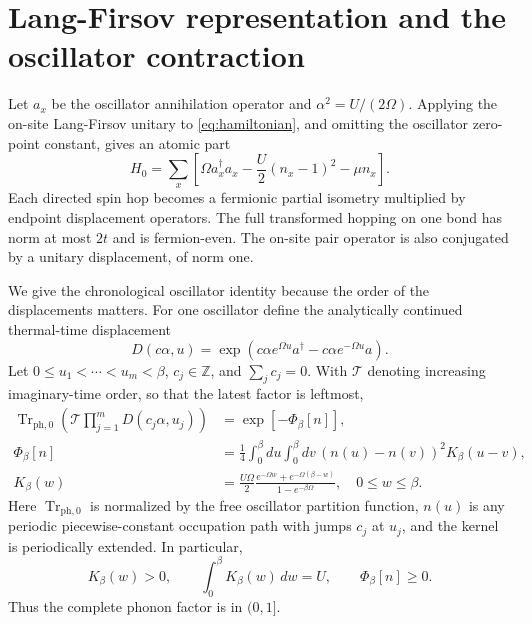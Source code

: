 \documentclass[11pt]{article}
\DeclareMathOperator{\Tr}{Tr}
\newcommand{\Trph}{\Tr_{\mathrm{ph},0}}
\begin{document}
\section{Lang-Firsov representation and the oscillator contraction}

Let $a_x$ be the oscillator annihilation operator and $\alpha^2=U/(2\Omega)$. Applying the on-site Lang-Firsov unitary to \eqref{eq:hamiltonian}, and omitting the oscillator zero-point constant, gives an atomic part
\begin{equation}\label{eq:atomic}
 H_0=\sum_x\left[\Omega a_x^\dagger a_x-\frac U2(n_x-1)^2-\mu n_x\right].
\end{equation}
Each directed spin hop becomes a fermionic partial isometry multiplied by endpoint displacement operators. The full transformed hopping on one bond has norm at most $2t$ and is fermion-even. The on-site pair operator is also conjugated by a unitary displacement, of norm one.

We give the chronological oscillator identity because the order of the displacements matters. For one oscillator define the analytically continued thermal-time displacement
\[
 D(c\alpha,u)=\exp\!\left(c\alpha e^{\Omega u}a^\dagger-c\alpha e^{-\Omega u}a\right).
\]
Let $0\le u_1<\cdots<u_m<\beta$, $c_j\in\mathbb Z$, and $\sum_jc_j=0$. With $\mathcal T$ denoting increasing imaginary-time order, so that the latest factor is leftmost,
\begin{align}
 \Trph\!\left(\mathcal T\prod_{j=1}^mD(c_j\alpha,u_j)\right)
 &=\exp[-\Phi_\beta[n]],\label{eq:chronological}\\
 \Phi_\beta[n]&=\frac14\int_0^\beta\!du\int_0^\beta\!dv\,
       (n(u)-n(v))^2K_\beta(u-v),\label{eq:phi}\\
 K_\beta(w)&=\frac{U\Omega}{2}
 \frac{e^{-\Omega w}+e^{-\Omega(\beta-w)}}{1-e^{-\beta\Omega}},
 \quad 0\le w\le\beta.\label{eq:kernel}
\end{align}
Here $\Trph$ is normalized by the free oscillator partition function, $n(u)$ is any periodic piecewise-constant occupation path with jumps $c_j$ at $u_j$, and the kernel is periodically extended. In particular,
\begin{equation}\label{eq:kernelmass}
 K_\beta(w)>0,\qquad \int_0^\beta K_\beta(w)\,dw=U,
 \qquad \Phi_\beta[n]\ge0.
\end{equation}
Thus the complete phonon factor is in $(0,1]$.
\end{document}

